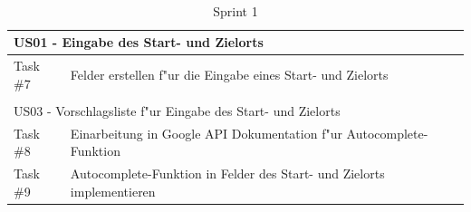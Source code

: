 \documentclass[a4paper, 11pt]{scrreprt}
\begin{document}
\begin{table}[H]

\caption{Sprint 1}

\ \\

\par

\label{tab:Sprint 1}

\centering

\begin{tabular}{|p{2.5cm} p{12cm}| ll}

\hline
\multicolumn{2}{|l|}{US01 - Eingabe des Start- und Zielorts}  \\

\hline
Task \#7 & Felder erstellen f"ur die Eingabe eines Start- und Zielorts\\

\hline
\multicolumn{2}{l}{}\\

\hline
\multicolumn{2}{|l|}{US03 - Vorschlagsliste f"ur Eingabe des Start- und Zielorts}\\

\hline
Task \#8 & Einarbeitung in Google API Dokumentation f"ur Autocomplete-Funktion\\

\hline
Task \#9 & Autocomplete-Funktion in Felder des Start- und Zielorts implementieren\\

\hline

\end{tabular}

\end{table}
\end{document}
